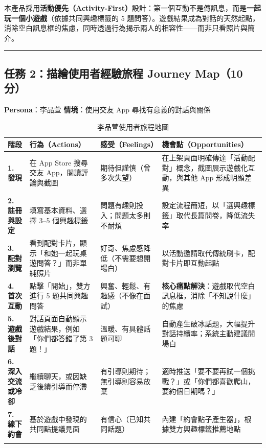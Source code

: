 \documentclass[12pt, a4paper]{article}
\begin{document}
本產品採用\textbf{活動優先（Activity-First）}設計：第一個互動不是傳訊息，而是\textbf{一起玩一個小遊戲}（依據共同興趣標籤的 5 題問答）。遊戲結果成為對話的天然起點，消除空白訊息框的焦慮，同時透過行為揭示兩人的相容性——而非只看照片與簡介。

\bigskip
\hrule
\bigskip

\subsection*{任務 2：描繪使用者經驗旅程 Journey Map（10 分）}

\textbf{Persona}：李品萱 \quad \textbf{情境}：使用交友 App 尋找有意義的對話與關係

\begin{longtable}{>{\bfseries}p{2.2cm} p{3.5cm} p{3.5cm} p{4.5cm}}
\toprule
階段 & 行為（Actions） & 感受（Feelings） & 機會點（Opportunities） \\
\midrule
\endhead
1. 發現 &
在 App Store 搜尋交友 App，閱讀評論與截圖 &
期待但謹慎（曾多次失望）&
在上架頁面明確傳達「活動配對」概念，截圖展示遊戲化互動，與其他 App 形成明顯差異 \\
\midrule
2. 註冊與設定 &
填寫基本資料、選擇 3--5 個興趣標籤 &
問題有趣則投入；問題太多則不耐煩 &
設定流程簡短，以「選興趣標籤」取代長篇問卷，降低流失率 \\
\midrule
3. 配對瀏覽 &
看到配對卡片，顯示「和她一起玩桌遊問答？」而非單純照片 &
好奇、焦慮感降低（不需要想開場白）&
以活動邀請取代傳統刷卡，配對卡片即互動起點 \\
\midrule
4. 首次互動 &
點擊「開始」，雙方進行 5 題共同興趣問答 &
興奮、輕鬆、有趣感（不像在面試）&
\textbf{核心痛點解決}：遊戲取代空白訊息框，消除「不知說什麼」的焦慮 \\
\midrule
5. 遊戲後對話 &
對話頁面自動顯示遊戲結果，例如「你們都答錯了第 3 題！」&
溫暖、有具體話題可聊 &
自動產生破冰話題，大幅提升對話持續率；系統主動建議開場白 \\
\midrule
6. 深入交流或冷卻 &
繼續聊天，或因缺乏後續引導而停滯 &
有引導則期待；無引導則容易放棄 &
適時推送「要不要再試一個挑戰？」或「你們都喜歡爬山，要約個日期嗎？」\\
\midrule
7. 線下約會 &
基於遊戲中發現的共同點提議見面 &
有信心（已知共同話題）&
內建「約會點子產生器」，根據雙方興趣標籤推薦地點 \\
\bottomrule
\caption{李品萱使用者旅程地圖}
\end{longtable}
\end{document}
